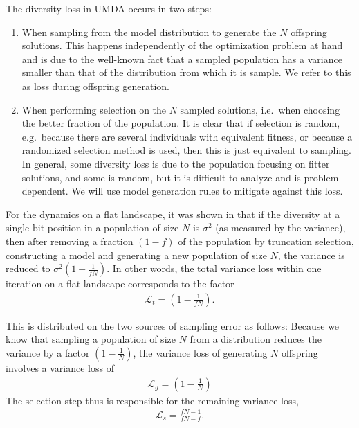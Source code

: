 \documentclass{acm_proc_article-sp}
\newcommand{\Np}{N}
\newcommand{\groupr}[1]{\ensuremath{\left( #1 \right)}}
\begin{document}
The diversity loss in UMDA occurs in two steps:
\begin{enumerate}
\item When sampling from the model distribution to generate the $N$
  offspring solutions. This happens independently of the optimization
  problem at hand and is due to the well-known fact that a sampled
  population has a variance smaller than that of the distribution from
  which it is sample. We refer to this as loss during offspring generation. 
\item When performing selection on the $N$ sampled solutions, i.e.\
  when choosing the better fraction of the population. It is clear
  that if selection is random, e.g.\ because there are several
  individuals with equivalent fitness, or because a randomized
  selection method is used, then this is just equivalent to
  sampling. In general, some diversity loss is due to the population
  focusing on fitter solutions, and some is random, but it is
  difficult to analyze and is problem dependent. We will use model generation
  rules to mitigate against this loss. 
\end{enumerate}


For the dynamics on a flat landscape, it was shown in \cite{Shapiro2006}
that if the diversity at a single bit position in a population of size
$\Np$ is $\sigma^2$ (as measured by the variance), then after removing
a fraction $(1-f)$ of the population by truncation selection, constructing a model
and generating a new population of size $\Np$, the variance is reduced
to $\sigma^2 \groupr{1-\frac{1}{f\Np}}$. In other words, the total variance
loss within one iteration on a flat landscape corresponds to the
factor
\begin{eqnarray}
\mathcal{L}_t=\groupr{1-\frac{1}{f\Np}}.
\end{eqnarray}

This is distributed on the two sources of sampling error as follows:
Because we know that sampling a population of size $\Np$ from a distribution reduces
the variance by a factor $(1-\frac{1}{\Np})$, the variance loss of generating
$\Np$ offspring involves a variance loss of 
\begin{eqnarray}
\mathcal{L}_g=\groupr{1-\frac{1}{\Np}}
\end{eqnarray}
The selection step thus is responsible for the remaining variance loss,
\begin{eqnarray}
\mathcal{L}_s=\frac{f\Np-1}{f\Np-f}.
\end{eqnarray}
\end{document}

